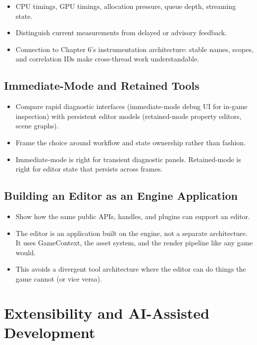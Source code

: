 \documentclass[
  11pt,
  letterpaper,
  DIV=11,
  numbers=noendperiod,
  twoside,
  open=right]{scrreprt}
\providecommand{\tightlist}{%
  \setlength{\itemsep}{0pt}\setlength{\parskip}{0pt}}
\begin{document}
\begin{itemize}
\tightlist
\item
  CPU timings, GPU timings, allocation pressure, queue depth, streaming
  state.
\item
  Distinguish current measurements from delayed or advisory feedback.
\item
  Connection to Chapter 6's instrumentation architecture: stable names,
  scopes, and correlation IDs make cross-thread work understandable.
\end{itemize}

\subsection{Immediate-Mode and Retained
Tools}\label{immediate-mode-and-retained-tools}

\begin{itemize}
\tightlist
\item
  Compare rapid diagnostic interfaces (immediate-mode debug UI for
  in-game inspection) with persistent editor models (retained-mode
  property editors, scene graphs).
\item
  Frame the choice around workflow and state ownership rather than
  fashion.
\item
  Immediate-mode is right for transient diagnostic panels. Retained-mode
  is right for editor state that persists across frames.
\end{itemize}

\subsection{Building an Editor as an Engine
Application}\label{building-an-editor-as-an-engine-application}

\begin{itemize}
\tightlist
\item
  Show how the same public APIs, handles, and plugins can support an
  editor.
\item
  The editor is an application built on the engine, not a separate
  architecture. It uses GameContext, the asset system, and the render
  pipeline like any game would.
\item
  This avoids a divergent tool architecture where the editor can do
  things the game cannot (or vice versa).
\end{itemize}

\section{Extensibility and AI-Assisted
Development}\label{extensibility-and-ai-assisted-development}
\end{document}
